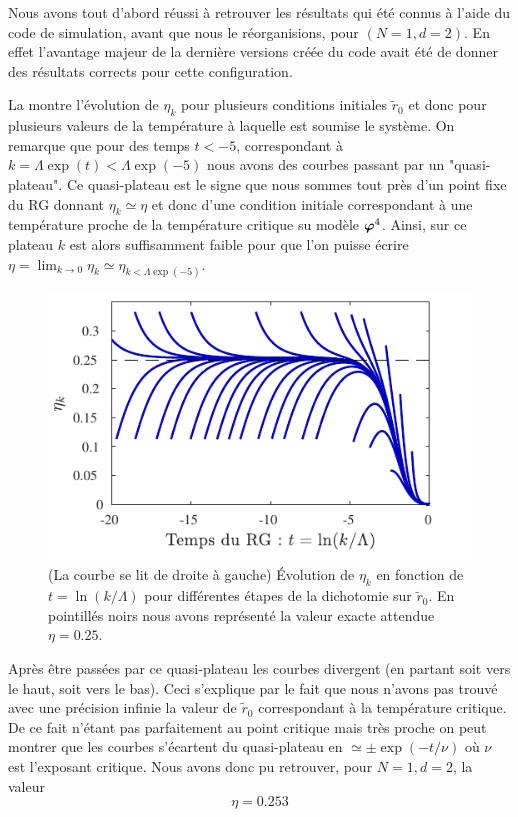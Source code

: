 \documentclass[10.5pt]{article}
\begin{document}
\begin{multicols*}{2}
Nous avons tout d'abord réussi à retrouver les résultats qui été connus à l'aide du code de simulation, avant que nous le réorganisions, pour $(N=1, d=2)$. En effet l'avantage majeur de la dernière versions créée du code avait été de donner des résultats corrects pour cette configuration.

La  montre l'évolution de $\eta_k$ pour plusieurs conditions initiales $\tilde{r}_0$ et donc pour plusieurs valeurs de la température à laquelle est soumise le système. On remarque que pour des temps $t<-5$, correspondant à $k = \Lambda\exp(t)< \Lambda \exp(-5)$ nous avons des courbes passant par un "quasi-plateau". Ce quasi-plateau est le signe que nous sommes tout près d'un point fixe du RG donnant $\eta_k \simeq \eta$ et donc d'une condition initiale correspondant à une température proche de la température critique su modèle $\boldsymbol{ \varphi}^4$. Ainsi, sur ce plateau $k$ est alors suffisamment faible pour que l'on puisse écrire $\eta = \lim_{k\to 0} \eta_k \simeq \eta_{k<\Lambda\exp(-5)}$. 
\begin{figure}[H]
	\begin{center}
		\includegraphics[width=0.95\columnwidth]{etakd2.pdf}
		\caption{(La courbe se lit de droite à gauche) Évolution de $\eta_k$ en fonction de $t= \ln(k/\Lambda)$ pour différentes étapes de la dichotomie sur $\tilde{r}_0$. En pointillés noirs nous avons représenté la valeur exacte attendue $\eta = 0.25$. }
		\label{fig:etakd2}
	\end{center}
\end{figure}
\vspace*{-20pt}
Après être passées par ce quasi-plateau les courbes divergent (en partant soit vers le haut, soit vers le bas). Ceci s'explique par le fait que nous n'avons pas trouvé avec une précision infinie la valeur de $\tilde{r}_0$ correspondant à la température critique. De ce fait n'étant pas parfaitement au point critique mais très proche on peut montrer que les courbes s'écartent du quasi-plateau en $\simeq \pm \exp(-t/\nu)$ où $\nu$ est l'exposant critique. Nous avons donc pu retrouver, pour $N=1, d =2$, la valeur
\begin{equation}
	\eta = 0.253 %
\end{equation}


\end{multicols*}
\end{document}
